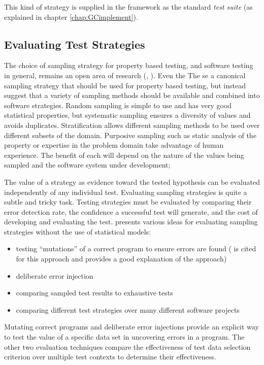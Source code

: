 \noindent
This kind of strategy is supplied in the \GC framework as the standard \emph{test suite}
(as explained in chapter \ref{chap:GCimplement}).

\subsection{Evaluating Test Strategies}

The choice of sampling strategy for property based testing,
and software testing in general,
remains an open area of research
(\cite{ZhuHallMay1997}, \cite{Hierons}).
Even the 
The se a canonical sampling strategy
that should be used for property based testing,
but instead suggest that a variety of sampling methods 
should be available and combined into software strategies.
Random sampling is simple to use and has very good statistical properties,
but systematic sampling ensures a diversity of values and avoids duplicates.
Stratification allows different sampling methods to be used 
over different subsets of the domain.
Purposive sampling such as static analysis of the property
or expertise in the problem domain take advantage of human experience.
The benefit of each will depend on 
the nature of the values being sampled and 
the software system under development;

The value of a strategy as evidence toward the tested hypothesis
can be evaluated independently of any individual test.
Evaluating sampling strategies is quite a subtle and tricky task.
Testing strategies must be evaluated by comparing their error detection rate,
the confidence a successful test will generate,
and the cost of developing and evaluating the test.
\cite{WeyukerEtal1991} presents various ideas for evaluating sampling strategies
without the use of statistical models:

\begin{itemize}
\item testing ``mutations'' of a correct program to ensure errors are found
(\cite{BuddEtal1980} is cited for this approach and provides a good explanation of the approach)
\item deliberate error injection
\item comparing sampled test results to exhaustive tests
\item comparing different test strategies over many different software projects
\end{itemize}

\noindent
Mutating correct programs and deliberate error injections
provide an explicit way to test the value of a specific data set
in uncovering errors in a program.
The other two evaluation techniques compare the effectiveness
of test data selection criterion over multiple test contexts to determine
their effectiveness.

